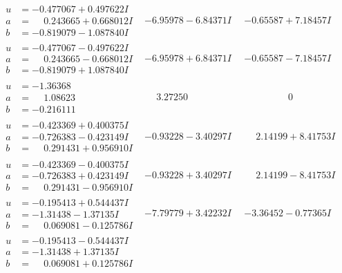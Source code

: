 \documentclass[1p]{elsarticle_modified}
\theoremstyle{definition}
\begin{document}
$$\begin{array}{c|c|c}
\begin{aligned}
u &= -0.477067 + 0.497622 I \\
a &= \phantom{-}0.243665 + 0.668012 I \\
b &= -0.819079 - 1.087840 I\end{aligned}
 & -6.95978 - 6.84371 I & -0.65587 + 7.18457 I \\ \hline\begin{aligned}
u &= -0.477067 - 0.497622 I \\
a &= \phantom{-}0.243665 - 0.668012 I \\
b &= -0.819079 + 1.087840 I\end{aligned}
 & -6.95978 + 6.84371 I & -0.65587 - 7.18457 I \\ \hline\begin{aligned}
u &= -1.36368\phantom{ +0.000000I} \\
a &= \phantom{-}1.08623\phantom{ +0.000000I} \\
b &= -0.216111\phantom{ +0.000000I}\end{aligned}
 & \phantom{-}3.27250\phantom{ +0.000000I} & \phantom{-0.000000 } 0 \\ \hline\begin{aligned}
u &= -0.423369 + 0.400375 I \\
a &= -0.726383 - 0.423149 I \\
b &= \phantom{-}0.291431 + 0.956910 I\end{aligned}
 & -0.93228 - 3.40297 I & \phantom{-}2.14199 + 8.41753 I \\ \hline\begin{aligned}
u &= -0.423369 - 0.400375 I \\
a &= -0.726383 + 0.423149 I \\
b &= \phantom{-}0.291431 - 0.956910 I\end{aligned}
 & -0.93228 + 3.40297 I & \phantom{-}2.14199 - 8.41753 I \\ \hline\begin{aligned}
u &= -0.195413 + 0.544437 I \\
a &= -1.31438 - 1.37135 I \\
b &= \phantom{-}0.069081 - 0.125786 I\end{aligned}
 & -7.79779 + 3.42232 I & -3.36452 - 0.77365 I \\ \hline\begin{aligned}
u &= -0.195413 - 0.544437 I \\
a &= -1.31438 + 1.37135 I \\
b &= \phantom{-}0.069081 + 0.125786 I\end{aligned}

\end{array}$$
\end{document}
